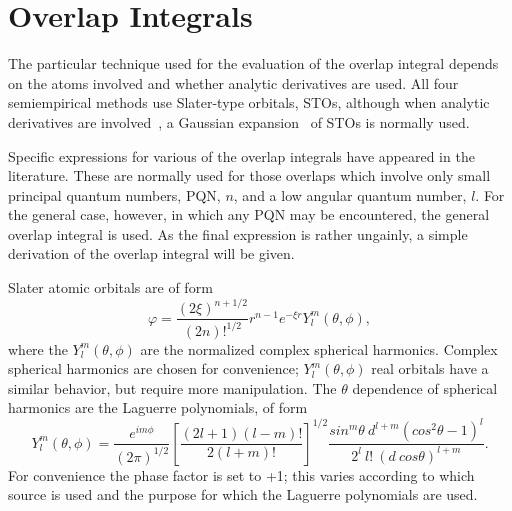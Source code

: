 \section{Overlap Integrals}
 The particular technique used for the evaluation of the
overlap integral depends on the atoms involved and whether
analytic derivatives are used. All four semiempirical
methods use Slater-type orbitals, STOs, although when
analytic derivatives are involved~\cite{analyt}, a Gaussian 
expansion~\cite{analyt}
of STOs is normally used. 

 Specific expressions for various of the overlap
integrals have appeared in the literature. These are
normally used for those overlaps which involve only small
principal quantum numbers, PQN, $n$, and a low angular quantum
number, $l$. For the general case, however, in which any PQN
may be encountered, the general overlap integral is used.
As the final expression is rather ungainly, a simple
derivation of the overlap integral will be given.

 Slater atomic orbitals are of form\label{so}
$$
\varphi = \frac{(2\xi )^{n+1/2}}{(2n)!^{1/2}}r^{n-1}e^{-\xi r}Y_l^m(\theta ,\phi ),
$$
where the $Y_l^m(\theta ,\phi )$ are the normalized complex spherical
harmonics. Complex spherical harmonics are chosen for
convenience; $Y_l^m(\theta ,\phi )$ real orbitals have a similar behavior,
but require more manipulation. The $\theta$ dependence of
spherical harmonics are the Laguerre polynomials, of form
$$
Y_l^m(\theta ,\phi ) = \frac{e^{im\phi }}{(2\pi )^{1/2}}\left [\frac{(2l+1)(l-m)!}{2(l+m)!}\right ]^{1/2}
\frac{sin^m\theta\ d^{l+m}(cos^2\theta-1)^l}{2^l\ l!\ (d\ cos\theta)^{l+m}}.
$$
For convenience the phase factor is set to +1; this varies
according to which source is used and the purpose for which
the Laguerre polynomials are used.

